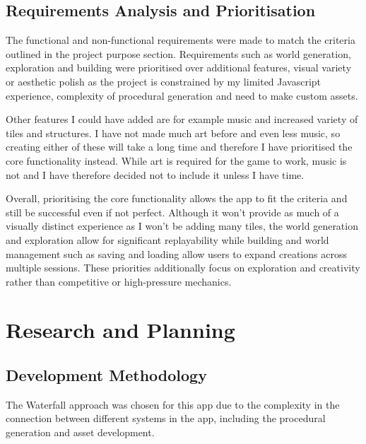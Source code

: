 \documentclass[14pt]{article}
\begin{document}
\subsection{Requirements Analysis and Prioritisation}
The functional and non-functional requirements were made to match the criteria outlined in the project purpose section. Requirements such as world generation, exploration and building were prioritised over additional features, visual variety or aesthetic polish as the project is constrained by my limited Javascript experience, complexity of procedural generation and need to make custom assets.

Other features I could have added are for example music and increased variety of tiles and structures. I have not made much art before and even less music, so creating either of these will take a long time and therefore I have prioritised the core functionality instead. While art is required for the game to work, music is not and I have therefore decided not to include it unless I have time.

Overall, prioritising the core functionality allows the app to fit the criteria and still be successful even if not perfect. Although it won't provide as much of a visually distinct experience as I won't be adding many tiles, the world generation and exploration allow for significant replayability while building and world management such as saving and loading allow users to expand creations across multiple sessions. These priorities additionally focus on exploration and creativity rather than competitive or high-pressure mechanics.


\section{Research and Planning}

\subsection{Development Methodology}
The Waterfall approach was chosen for this app due to the complexity in the connection between different systems in the app, including the procedural generation and asset development.
\end{document}
